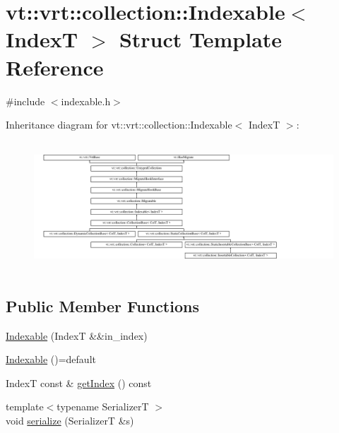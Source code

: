 \hypertarget{structvt_1_1vrt_1_1collection_1_1_indexable}{}\section{vt\+:\+:vrt\+:\+:collection\+:\+:Indexable$<$ IndexT $>$ Struct Template Reference}
\label{structvt_1_1vrt_1_1collection_1_1_indexable}


{\ttfamily \#include $<$indexable.\+h$>$}

Inheritance diagram for vt\+:\+:vrt\+:\+:collection\+:\+:Indexable$<$ IndexT $>$\+:\begin{figure}[H]
\begin{center}
\leavevmode
\includegraphics[height=4.873803cm]{structvt_1_1vrt_1_1collection_1_1_indexable}
\end{center}
\end{figure}
\subsection*{Public Member Functions}
\begin{DoxyCompactItemize}
\item 
\hyperlink{structvt_1_1vrt_1_1collection_1_1_indexable_ad3f327a35771a31ec63241b9be57569c}{Indexable} (IndexT \&\&in\+\_\+index)
\item 
\hyperlink{structvt_1_1vrt_1_1collection_1_1_indexable_a6390131bf531b7128367c51c788305c2}{Indexable} ()=default
\item 
IndexT const  \& \hyperlink{structvt_1_1vrt_1_1collection_1_1_indexable_a28d05f23e7a20e12e94b8235305c1e82}{get\+Index} () const
\item 
{\footnotesize template$<$typename SerializerT $>$ }\\void \hyperlink{structvt_1_1vrt_1_1collection_1_1_indexable_adadd30272517d10e6124a65edc48fb65}{serialize} (SerializerT \&s)
\end{DoxyCompactItemize}
